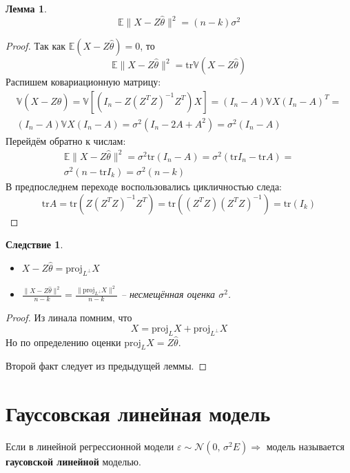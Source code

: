 \documentclass[a4paper,12pt]{article}
\theoremstyle{plain}
\newtheorem{lemma}{Лемма}[section]
\newtheorem*{corollary}{Следствие}
\theoremstyle{definition}
\theoremstyle{remark}
\begin{document}
\begin{lemma}
  \[
    \mathbb{E}\|X - Z\hat{\theta}\|^2 = (n - k)\sigma^2
  \]
\end{lemma}

\begin{proof}
  Так как $\mathbb{E}(X - Z\hat{\theta}) = 0$, то
  \[
    \mathbb{E}\|X - Z\hat{\theta}\|^2 = \text{tr}\mathbb{V}(X - Z\hat{\theta})
  \]
  Распишем ковариационную матрицу:
  \begin{align*}
    \mathbb{V}(X - Z\hat{\theta}) = \mathbb{V}[(I_n - Z(Z^TZ)^{-1}Z^T)X]=(I_n - A)\mathbb{V}X(I_n - A)^T =\\
    (I_n - A)\mathbb{V}X(I_n - A) = \sigma^2(I_n - 2A + A^2) = \sigma^2(I_n - A)
  \end{align*}
  Перейдём обратно к числам:
  \begin{align*}
    \mathbb{E}\|X - Z\hat{\theta}\|^2 = \sigma^2\text{tr}(I_n - A) = \sigma^2(\text{tr}I_n - \text{tr}A) =\\
    \sigma^2(n -  \text{tr}I_k) = \sigma^2(n - k)
  \end{align*}
  В предпоследнем переходе воспользовались цикличностью следа:
  \[
    \text{tr}A = \text{tr}(Z(Z^TZ)^{-1}Z^T) = \text{tr}((Z^TZ)(Z^TZ)^{-1}) = \text{tr}(I_k)
  \]
\end{proof}

\begin{corollary}
  \begin{itemize}
    \item $X - Z\hat{\theta} = \text{proj}_{L^\bot}X$
    \item $\frac{\|X - Z\hat{\theta}\|^2}{n - k} = \frac{\|\text{proj}_{L^\bot}X\|^2}{n - k}$ -- несмещённая оценка $\sigma^2$.
  \end{itemize}
\end{corollary}

\begin{proof}
  Из линала помним, что
  \[
    X = \text{proj}_LX + \text{proj}_{L^\bot}X
  \]
  Но по определению оценки $\text{proj}_LX = Z\hat{\theta}$.

  Второй факт следует из предыдущей леммы.
\end{proof}

\section{Гауссовская линейная модель}
Если в линейной регрессионной модели $\varepsilon \sim \mathcal{N}(0,\, \sigma^2E) \Rightarrow$ модель называется \textbf{гаусовской линейной} моделью.
\end{document}

